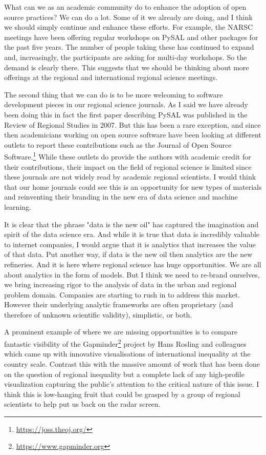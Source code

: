 \documentclass[11pt]{article}
\begin{document}
What can we as an academic community do to enhance the adoption of open source
practices? We can do a lot. Some of it we already are doing, and I think we
should simply continue and enhance these efforts. For example, the NARSC
meetings have been offering regular workshops on PySAL and other packages
for the past five years. The number of people taking these has
continued to expand and, increasingly, the participants are asking for
multi-day workshops. So the demand is clearly there. This suggests that we
should be thinking about more offerings at the regional and international
regional science meetings.

The second thing that we can do is to be more welcoming to software development
pieces in our regional science journals. As I said we have already been doing
this in fact the first paper describing PySAL was published in the Review of
Regional Studies in 2007. But this has been a rare exception, and since then
academicians working on open source software have been looking at different
outlets to report these contributions such as the Journal of Open Source
Software.\footnote{\url{https://joss.theoj.org/}} While these outlets do provide the authors with academic credit for
their contributions, their impact on the field of regional science is limited
since these journals are not widely read by academic regional scientists. I
would think that our home journals could see this is an opportunity for new
types of materials and reinventing their branding in the new era of  
data science and machine learning. 


It is clear that the phrase "data is the new oil" has captured the imagination
and spirit of the data science era. And while it is true that data is incredibly
valuable to internet companies, I would argue that it is analytics that
increases the value of that data. Put another way, if data is the new oil then
analytics are the new refineries. And it is here where regional science has huge
opportunities. We are all about analytics in the form of models. But I think we
need to re-brand ourselves, we bring increasing rigor to the analysis of data in
the urban and regional problem domain.  Companies are starting to rush in
to address this market. However their underlying analytic frameworks are often
proprietary (and therefore of unknown scientific validity), simplistic, or both.

A prominent example of where we are missing opportunities is to compare
fantastic visibility of the Gapminder\footnote{\url{https://www.gapminder.org}} project by
Hans Rosling and colleagues which came up with innovative visualisations of
international inequality at the country scale. Contrast this with the massive
amount of work that has been done on the question of regional inequality but
a complete lack of any high-profile visualization capturing the public's
attention to the critical nature of this issue. I think this is low-hanging
fruit that could be grasped by a group of regional scientists to help put
us back on the radar screen.
\end{document}
